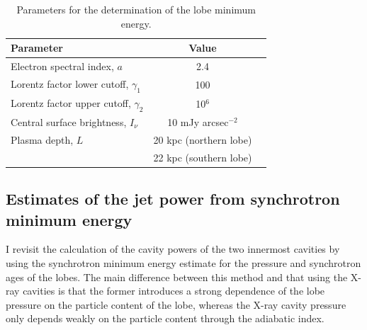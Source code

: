\begin{table}
\caption{Parameters for the determination of the lobe minimum energy.} 
\centering
\begin{tabular}{l c c}
 \hline  \hline
 Parameter & Value \\
 \hline 
 Electron spectral index, $a$  &  2.4 \\
 Lorentz factor lower cutoff, $\gamma_1$   &  100                       \\ 
 Lorentz factor upper cutoff, $\gamma_2$ &   10$^6$ \\  
 Central surface brightness, $I_{\nu}$       & 10 mJy arcsec$^{-2}$	 \\ 
 Plasma depth, $L$    & 20 kpc (northern lobe) \\ 
                          & 22 kpc (southern lobe) \\ \hline
\end{tabular}
\label{radio_data}
\end{table}



%
%
\subsection{Estimates of the jet power from synchrotron minimum energy}\label{s:powr}


I revisit the calculation of the cavity powers of the two innermost cavities \citep[see][]{wise07} by using the synchrotron minimum energy estimate for the pressure and synchrotron ages of the lobes. The main difference between this method and that using the X-ray cavities is that the former introduces a strong dependence of the lobe pressure on the particle content of the lobe, whereas the X-ray cavity pressure only depends weakly on the particle content through the adiabatic index. 

